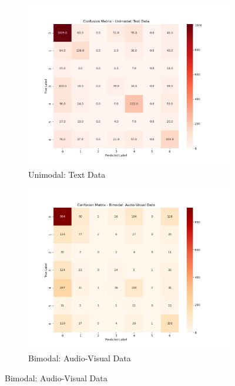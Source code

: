 \begin{figure}[htbp]
    \vspace{0.5cm} %

    \begin{subfigure}[b]{0.45\textwidth}
        \centering
        \includegraphics[width=\textwidth]{figures/text.png}
        \caption{Unimodal: Text Data}
    \end{subfigure}
    \hfill
    \begin{subfigure}[b]{0.45\textwidth}
        \centering
        \includegraphics[width=\textwidth]{figures/audio-visual.png}
        \caption{Bimodal: Audio-Visual Data}
    \end{subfigure}


\end{figure}
